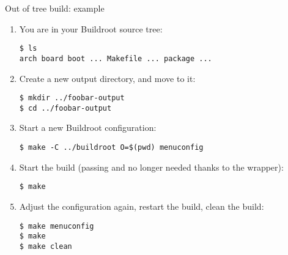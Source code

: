 \begin{frame}[fragile]{Out of tree build: example}
  \small
  \begin{enumerate}
  \item You are in your Buildroot source tree:\\
{\tiny
\begin{block}{}
\begin{verbatim}
$ ls
arch board boot ... Makefile ... package ...
\end{verbatim}
\end{block}
}
  \item Create a new output directory, and move to it:\\
{\tiny
\begin{block}{}
\begin{verbatim}
$ mkdir ../foobar-output
$ cd ../foobar-output
\end{verbatim}
\end{block}
}
  \item Start a new Buildroot configuration:\\
{\tiny
\begin{block}{}
\begin{verbatim}
$ make -C ../buildroot O=$(pwd) menuconfig
\end{verbatim}
\end{block}
}
  \item Start the build (passing  and  no longer needed thanks to the wrapper):\\
{\tiny
\begin{block}{}
\begin{verbatim}
$ make
\end{verbatim}
\end{block}
}
  \item Adjust the configuration again, restart the build, clean the build:\\
{\tiny
\begin{block}{}
\begin{verbatim}
$ make menuconfig
$ make
$ make clean
\end{verbatim}
\end{block}
}
  \end{enumerate}
\end{frame}

